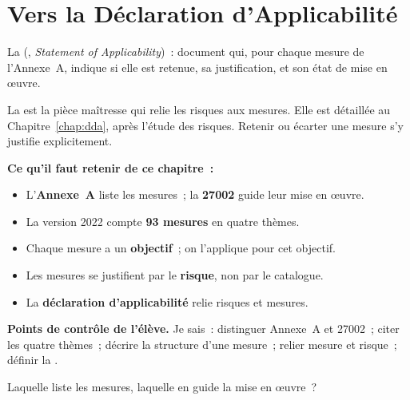\section{Vers la Déclaration d'Applicabilité}
\label{sec:c10-soa}

\begin{boxdef}
La  (, \emph{Statement of
Applicability})~: document qui, pour chaque mesure de l'Annexe~A, indique si
elle est retenue, sa justification, et son état de mise en \oe uvre.
\end{boxdef}

La  est la pièce maîtresse qui relie les risques aux mesures. Elle
est détaillée au Chapitre~\ref{chap:dda}, après l'étude des risques. Retenir
ou écarter une mesure s'y justifie explicitement.

\separateur

\begin{boxresume}
\textbf{Ce qu'il faut retenir de ce chapitre~:}
\begin{itemize}
    \item L'\textbf{Annexe~A} liste les mesures~; la \textbf{27002} guide leur
          mise en \oe uvre.
    \item La version 2022 compte \textbf{93 mesures} en quatre thèmes.
    \item Chaque mesure a un \textbf{objectif}~; on l'applique pour cet
          objectif.
    \item Les mesures se justifient par le \textbf{risque}, non par le
          catalogue.
    \item La \textbf{déclaration d'applicabilité} relie risques et mesures.
    \end{itemize}
\end{boxresume}

\begin{boxinfo}
\textbf{Points de contrôle de l'élève.} Je sais~: distinguer Annexe~A et
27002~; citer les quatre thèmes~; décrire la structure d'une mesure~; relier
mesure et risque~; définir la .
\end{boxinfo}

\bigskip

\begin{boxexo}[title={\ding{45}\quad Exercice~10.1. Annexe A ou 27002 \niveaubase}]
Laquelle liste les mesures, laquelle en guide la mise en \oe uvre~?
\end{boxexo}

